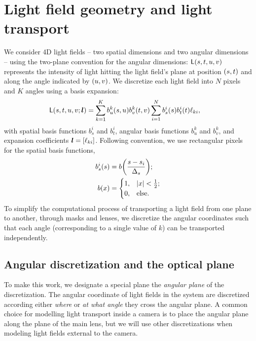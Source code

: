 \section{Light field geometry and light transport}

We consider 4D light fields -- two spatial dimensions and two angular
dimensions -- using the two-plane convention for the angular dimensions:
$\mathsf{L} {\left( s, t, u, v \right)}$ represents the intensity of light hitting the 
light field's plane at position $ {\left( s,t \right)}$ and along the angle indicated
by $ {\left( u,v \right)}$.  We discretize each light field into $N$ pixels and $K$ 
angles using a basis expansion:
\begin{align}
    \label{eqn,basis}
    \mathsf{L} {\left( s,t,u,v; {\bm{l}} \right)}
    &=
    \sum_{k=1}^K b^k_u {\left( s, u \right)} b^k_v {\left( t, v \right)} 
    \sum_{i=1}^N b^i_s {\left( s \right)} b^i_t {\left( t \right)}
    \ell_{ki},
\end{align}
with spatial basis functions $b^i_s$ and $b^i_t$, angular basis 
functions $b^k_u$ and $b^k_v$, and expansion coefficients 
${\bm{l}} =  {\left[ \ell_{ki} \right] }$.  Following convention, we use rectangular
pixels for the spatial basis functions, \eg{}
\begin{align}
    b^i_s {\left( s \right)}
    &=
    b {\left( \frac{s - s_i}{\Delta_s} \right)};
    \nonumber \\
    b {\left( x \right)}
    &=
    \begin{cases}
        1, &  {\left| x \right| } < \frac{1}{2}; \\
        0, & \text{else.}
    \end{cases}
    \label{eqn,box}
\end{align}
To simplify the computational process of transporting a light field from
one plane to another, through masks and lenses, we discretize the angular
coordinates such that each angle (corresponding to a single value of $k$)
can be transported independently.

\subsection{Angular discretization and the optical plane}

To make this work, we designate a special plane the {\it angular plane} of
the discretization.  The angular coordinate of light fields in the system are
discretized according either {\it where} or {\it at what angle} they cross
the angular plane.  A common choice for modelling light transport inside a 
camera is to place the angular plane along the plane of the main lens, but we
will use other discretizations when modeling light fields external to the
camera.

